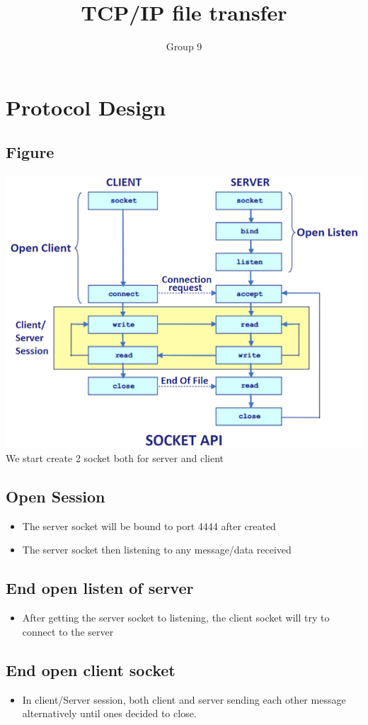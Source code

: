 \documentclass{article}
\author{Group 9}
\title{TCP/IP file transfer}
\begin{document}
\maketitle
\section{Protocol Design}
\subsection{Figure}
\includegraphics{Capture.PNG}
\newpage
{We start create 2 socket both for server and client}
\subsection{Open Session}
\begin{itemize}
    \item The server socket will be bound to port 4444 after created 
    \item The server socket then listening to any message/data received
\end{itemize}
\subsection{End open listen of server}
\begin{itemize}
    \item After getting the server socket to listening, the client socket will try to connect to the server
\end{itemize}
\subsection{End open client socket}
\begin{itemize}
    \item In client/Server session, both client and server sending each other message alternatively until ones decided to close.
\end{itemize}
\end{document}
